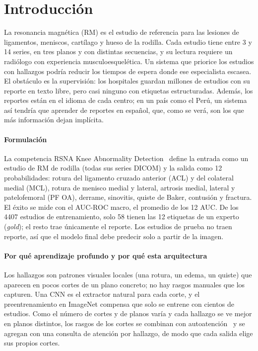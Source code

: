 \documentclass[conference]{IEEEtran}
\begin{document}
\section{Introducción}
\label{sec:intro}

La resonancia magnética (RM) es el estudio de referencia para las lesiones de ligamentos, meniscos, cartílago y hueso de la rodilla.
Cada estudio tiene entre 3 y 14 series, en tres planos y con distintas secuencias, y su lectura requiere un radiólogo con experiencia musculoesquelética.
Un sistema que priorice los estudios con hallazgos podría reducir los tiempos de espera donde ese especialista escasea.
El obstáculo es la supervisión: los hospitales guardan millones de estudios con su reporte en texto libre, pero casi ninguno con etiquetas estructuradas.
Además, los reportes están en el idioma de cada centro; en un país como el Perú, un sistema así tendría que aprender de reportes en español, que, como se verá, son los que más información dejan implícita.

\paragraph*{Formulación}
La competencia RSNA Knee Abnormality Detection~\cite{rsna2026knee} define la entrada como un estudio de RM de rodilla (todas sus series DICOM) y la salida como 12 probabilidades: rotura del ligamento cruzado anterior (ACL) y del colateral medial (MCL), rotura de menisco medial y lateral, artrosis medial, lateral y patelofemoral (PF OA), derrame, sinovitis, quiste de Baker, contusión y fractura.
El éxito se mide con el AUC-ROC macro, el promedio de los 12 AUC.
De los 4407 estudios de entrenamiento, solo 58 tienen las 12 etiquetas de un experto (\emph{gold}); el resto trae únicamente el reporte.
Los estudios de prueba no traen reporte, así que el modelo final debe predecir solo a partir de la imagen.

\paragraph*{Por qué aprendizaje profundo y por qué esta arquitectura}
Los hallazgos son patrones visuales locales (una rotura, un edema, un quiste) que aparecen en pocos cortes de un plano concreto; no hay rasgos manuales que los capturen.
Una CNN es el extractor natural para cada corte, y el preentrenamiento en ImageNet compensa que solo se entrene con cientos de estudios.
Como el número de cortes y de planos varía y cada hallazgo se ve mejor en planos distintos, los rasgos de los cortes se combinan con autoatención~\cite{vaswani2017attention} y se agregan con una consulta de atención por hallazgo, de modo que cada salida elige sus propios cortes.
\end{document}
